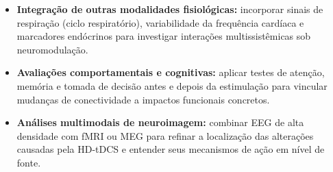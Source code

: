 \begin{itemize}
  \item \textbf{Integração de outras modalidades fisiológicas:} incorporar sinais de respiração (ciclo respiratório), variabilidade da frequência cardíaca e marcadores endócrinos para investigar interações multissistêmicas sob neuromodulação.
  \item \textbf{Avaliações comportamentais e cognitivas:} aplicar testes de atenção, memória e tomada de decisão antes e depois da estimulação para vincular mudanças de conectividade a impactos funcionais concretos.
  \item \textbf{Análises multimodais de neuroimagem:} combinar EEG de alta densidade com fMRI ou MEG para refinar a localização das alterações causadas pela HD-tDCS e entender seus mecanismos de ação em nível de fonte.
\end{itemize}